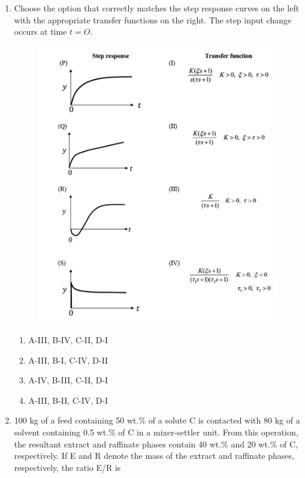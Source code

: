 \documentclass[journal,12pt,onecolumn]{IEEEtran}
\theoremstyle{remark}
\begin{document}
\begin{enumerate}
 

\begin{multicols}{4}
    \begin{enumerate}
        \item $\frac{2}{\brak{56s + 1}^{2}}$
        \item $\frac{2}{\brak{62s + 1}^{2}}$
        \item $\frac{2}{\brak{36s + 1}^{2}}$
        \item $\frac{2}{\brak{49s + 1}^{2}}$
    \end{enumerate}
\end{multicols}
\newpage
    \item 
         Choose the option that correctly matches the step response curves on the left with the appropriate transfer functions on the right. The step input change occurs at time $t=O$. 
    
\begin{figure}[H]
  \centering
    \includegraphics[width=0.8\columnwidth]{Fig/34.png}
   \caption*{}
    \label{fig: 34}
\end{figure}
\begin{multicols}{2}
    \begin{enumerate}
        \item A-III, B-IV, C-II, D-I
        \item A-III, B-I, C-IV, D-II
        \item A-IV, B-III, C-II, D-I
        \item A-III, B-II, C-IV, D-I
    \end{enumerate}
\end{multicols}
\newpage
    \item 
         100 kg of a feed containing 50 wt.\% of a solute C is contacted with 80 kg of a solvent containing 0.5 wt.\% of C in a mixer-settler unit. From this operation, the resultant extract and raffinate phases contain 40 wt.\% and 20 wt.\% of C, respectively. If E and R denote the mass of the extract and raffinate phases, respectively, the ratio E/R is 


\end{enumerate}
\end{document}
